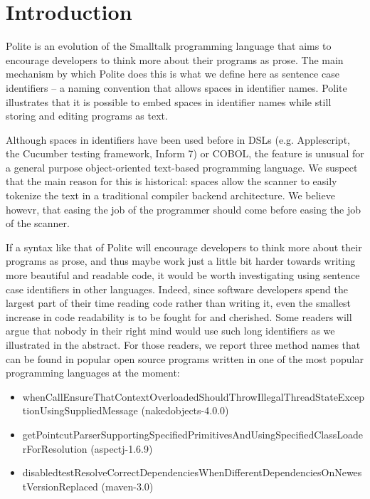 
\section{Introduction}

Polite is an evolution of the Smalltalk programming language that aims to encourage developers to think more about their programs as prose. The main mechanism by which Polite does this is what we define here as sentence case identifiers -- a naming convention that allows spaces in identifier names. Polite illustrates that it is possible to embed spaces in identifier names while still storing and editing programs as text. 

Although spaces in identifiers have been used before in DSLs (e.g. Applescript, the Cucumber testing framework, Inform 7) or COBOL, the feature is unusual for a general purpose object-oriented text-based programming language. We suspect that the main reason for this is historical: spaces allow the scanner to easily tokenize the text in a traditional compiler backend architecture. We believe howevr, that easing the job of the programmer should come before easing the job of the scanner. 

If a syntax like that of Polite will encourage developers to think more about their programs as prose, and thus maybe work just a little bit harder towards writing more beautiful and readable code, it would be worth investigating using sentence case identifiers in other languages. Indeed, since software developers spend the largest part of their time reading code rather than writing it, even the smallest increase in code readability is to be fought for and cherished.
Some readers will argue that nobody in their right mind would use such long identifiers as we illustrated in the abstract. For those readers, we report three method names that can be found in popular open source programs written in one of the most popular programming languages at the moment: 

\begin{itemize}
	\item whenCallEnsureThatContextOverloadedShouldThrowIllegalThreadStateExceptionUsingSuppliedMessage (nakedobjects-4.0.0)
	\item getPointcutParserSupportingSpecifiedPrimitivesAndUsingSpecifiedClassLoaderForResolution (aspectj-1.6.9)
	\item disabledtestResolveCorrectDependenciesWhenDifferentDependenciesOnNewestVersionReplaced (maven-3.0)
\end{itemize}
